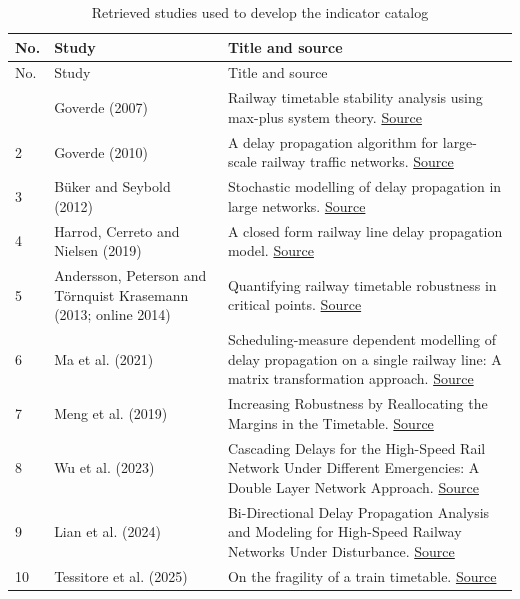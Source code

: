 \begingroup
\small
\setlength{\tabcolsep}{5pt}
\begin{longtable}{@{}p{.04\linewidth}>{\raggedright\arraybackslash}p{.20\linewidth}>{\raggedright\arraybackslash}p{.68\linewidth}@{}}
\caption{Retrieved studies used to develop the indicator catalog}\label{tab:retrieved-studies}\\
\toprule No. & Study & Title and source \\ \midrule
\endfirsthead
\toprule No. & Study & Title and source \\ \midrule
\endhead
\bottomrule
\endfoot
1 & Goverde (2007) & Railway timetable stability analysis using max-plus system theory. \href{https://doi.org/10.1016/j.trb.2006.02.003}{Source} \\
2 & Goverde (2010) & A delay propagation algorithm for large-scale railway traffic networks. \href{https://doi.org/10.1016/j.trc.2010.01.002}{Source} \\
3 & Büker and Seybold (2012) & Stochastic modelling of delay propagation in large networks. \href{https://doi.org/10.1016/j.jrtpm.2012.10.001}{Source} \\
4 & Harrod, Cerreto and Nielsen (2019) & A closed form railway line delay propagation model. \href{https://doi.org/10.1016/j.trc.2019.02.022}{Source} \\
5 & Andersson, Peterson and Törnquist Krasemann (2013; online 2014) & Quantifying railway timetable robustness in critical points. \href{https://doi.org/10.1016/j.jrtpm.2013.12.002}{Source} \\
6 & Ma et al. (2021) & Scheduling-measure dependent modelling of delay propagation on a single railway line: A matrix transformation approach. \href{https://doi.org/10.1049/itr2.12112}{Source} \\
7 & Meng et al. (2019) & Increasing Robustness by Reallocating the Margins in the Timetable. \href{https://doi.org/10.1155/2019/1382394}{Source} \\
8 & Wu et al. (2023) & Cascading Delays for the High-Speed Rail Network Under Different Emergencies: A Double Layer Network Approach. \href{https://doi.org/10.1109/JAS.2022.105530}{Source} \\
9 & Lian et al. (2024) & Bi-Directional Delay Propagation Analysis and Modeling for High-Speed Railway Networks Under Disturbance. \href{https://doi.org/10.1109/TCSS.2023.3322747}{Source} \\
10 & Tessitore et al. (2025) & On the fragility of a train timetable. \href{https://doi.org/10.1016/j.omega.2025.103341}{Source} \\

\end{longtable}
